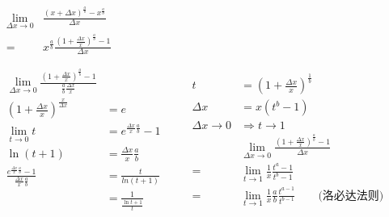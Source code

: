 \documentclass{article}
\begin{document}
  \begin{gather}
    \begin{aligned}
      \lim_{\Delta{x} \to 0}& \frac{\left(x+\Delta{x}\right)^{\frac{a}{b}} - x^{\frac{a}{b}}}{\Delta{x}} \\
      =& x^{\frac{a}{b}} \frac{ \left( 1 + \frac{\Delta{x}}{x} \right)^{\frac{a}{b}} - 1}{\Delta{x}} \\
    \end{aligned} \\
    \begin{aligned}
      \lim_{\Delta{x} \to 0} \frac{\left( 1 + \frac{\Delta{x}}{x} \right)^{\frac{a}{b}} - 1} {\frac{a}{b} \frac{\Delta{x}}{x}} \\
      \left( 1 + \frac{\Delta{x}}{x} \right)^{\frac{x}{\Delta{x}}} &= e \\
      \lim_{t \to 0} t &= e^{\frac{\Delta{x}}{x} \frac{a}{b}} - 1\\
      \ln \left( t + 1 \right) &= \frac{\Delta{x}}{x} \frac{a}{b} \\
      \frac{e^{\frac{\Delta{x}}{x} \frac{a}{b}} - 1}{\frac{\Delta{x}}{x} \frac{a}{b}} &=
      \frac{t}{ln \left( t + 1 \right)} \\
      &= \frac{1}{\frac{\ln t + 1}{t}}
    \end{aligned}
    \qquad
    \begin{aligned}
      t &= \left(1 + \frac{\Delta{x}}{x} \right)^{\frac{1}{b}} \\
      \Delta{x} &= x \left( t^{b} - 1 \right) \\
      \Delta{x} \to 0 &\Rightarrow t \to 1 \\
      &\lim_{\Delta{x} \to 0} \frac{ \left( 1 + \frac{\Delta{x}}{x} \right)^{\frac{a}{b}} - 1}{\Delta{x}} \\
      = &\lim_{t \to 1} \frac{1}{x} \frac{t^{a} - 1}{t^{b} - 1} \\
      = &\lim_{t \to 1} \frac{1}{x} \frac{a}{b} \frac{t^{a -1}}{t^{b - 1}} \qquad \text{(洛必达法则)} %
    \end{aligned}
  \end{gather}
\end{document}
